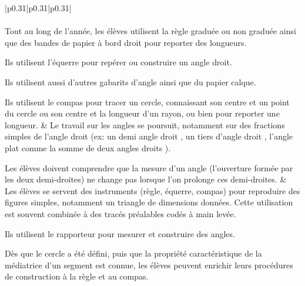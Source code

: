 {\begin{tabular}{|p{0.31\linewidth}|p{0.31\linewidth}|p{0.31\linewidth}|}
\\\hline
{}\\\hline 
Tout au long de l’année, les élèves utilisent la règle graduée ou non graduée ainsi que des bandes de papier à bord droit pour reporter des longueurs.\par 
Ils utilisent l’équerre pour repérer ou construire un angle droit.\par
Ils utilisent aussi d’autres gabarits d’angle ainsi que du papier calque.\par
Ils utilisent le compas pour tracer un cercle, connaissant son centre et un point du cercle ou son centre et la longueur d’un rayon, ou bien pour reporter une longueur.
&
Le travail sur les angles se poursuit, notamment sur des fractions simples de l’angle droit (ex: un \og   demi angle droit \fg , \og   un tiers d’angle droit \fg , \og   l’angle plat comme la somme de deux angles droits \fg ).\par 
Les élèves doivent comprendre que la mesure d’un angle (\og   l’ouverture \fg  formée par les deux demi-droites) ne change pas lorsque l’on prolonge ces demi-droites.
&
Les élèves se servent des instruments (règle, équerre, compas) pour reproduire des figures simples, notamment un triangle de dimensions données. Cette utilisation est souvent combinée à des tracés préalables codés à main levée.\par 
Ils utilisent le rapporteur pour mesurer et construire des angles.\par 
Dès que le cercle a été défini, puis que la propriété caractéristique de la médiatrice d’un segment est connue, les élèves peuvent enrichir leurs procédures de construction à la règle et au compas.
\\\hline
\end{tabular}
\renewcommand{\arraystretch}{1}
}